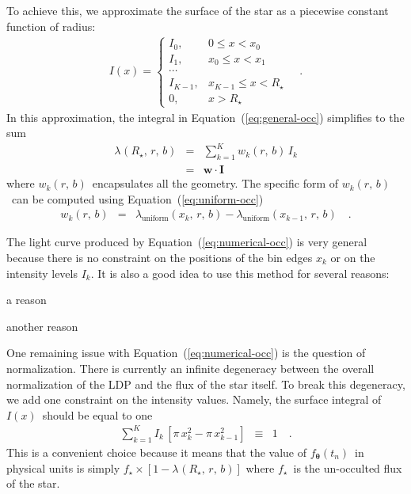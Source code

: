 \documentclass[12pt,preprint]{aastex}
\newcommand{\Eq}[1]{Equation~(\ref{eq:#1})}
\newcommand{\eq}[1]{\Eq{#1}}
\newcommand{\eqlabel}[1]{\label{eq:#1}}
\newcommand{\bvec}[1]{\ensuremath{\boldsymbol{#1}}}
\newcommand{\model}{\ensuremath{\bvec{\theta}}}
\newcommand{\tobs}{\ensuremath{t_n}}
\newcommand{\fmodel}{\ensuremath{f_{\model} (\tobs)}}
\newcommand{\rstar}{\ensuremath{R_\star}}
\newcommand{\rplanet}{\ensuremath{r}}
\newcommand{\impactpar}{\ensuremath{b}}
\newcommand{\occbase}[2]{\ensuremath{\lambda_{#1}(#2,\,\rplanet,\,\impactpar)}}
\newcommand{\occ}[1]{\occbase{#1}{\rstar}}
\newcommand{\occultation}{\occ{}}
\newcommand{\occuniformer}[1]{\occbase{\mathrm{uniform}}{#1}}
\newcommand{\rsurface}{\ensuremath{x}}
\newcommand{\ldp}{\ensuremath{I(\rsurface)}}
\newcommand{\geomw}{\ensuremath{w_k (\rplanet,\,\impactpar)}}
\newcommand{\fstar}{\ensuremath{f_\star}}
\begin{document}
To achieve this, we approximate the surface of the star as a piecewise
constant function of radius:
\begin{eqnarray}
    \ldp = \left \{ \begin{array}{ll}
        I_0, & 0 \le \rsurface < \rsurface_0 \\
        I_1, & \rsurface_0 \le \rsurface < \rsurface_1 \\
        \cdots & \\
        I_{K-1}, & \rsurface_{K-1} \le \rsurface < \rstar \\
        0, & \rsurface > \rstar
    \end{array}\right . \quad.
\end{eqnarray}
In this approximation, the integral in \eq{general-occ} simplifies to the sum
\begin{eqnarray}\eqlabel{numerical-occ}
    \occultation & = & \sum_{k=1}^K \geomw \, I_k \\
                 & = & \bvec{w} \cdot \bvec{I}
\end{eqnarray}
where \geomw\ encapsulates all the geometry.
The specific form of \geomw\ can be computed using \eq{uniform-occ}
\begin{eqnarray}
    \geomw & = & \occuniformer{\rsurface_k}
                 - \occuniformer{\rsurface_{k-1}} \quad.
\end{eqnarray}

The light curve produced by \eq{numerical-occ} is very general because
there is no constraint on the positions of the bin edges $\rsurface_k$ or on
the intensity levels $I_k$.
It is also a good idea to use this method for several reasons:
\begin{enumerate}
    {\item a reason}
    {\item another reason}
\end{enumerate}

One remaining issue with \eq{numerical-occ} is the question of normalization.
There is currently an infinite degeneracy between the overall normalization of
the LDP and the flux of the star itself.
To break this degeneracy, we add one constraint on the intensity values.
Namely, the surface integral of \ldp\ should be equal to one
\begin{eqnarray}
    \sum_{k=1}^{K} I_k \, \left [\pi\,\rsurface_k^2
                                 - \pi\,\rsurface_{k-1}^2 \right ]
        & \equiv & 1 \quad.
\end{eqnarray}
This is a convenient choice because it means that the value of \fmodel\ in
physical units is simply $\fstar \times \left [1 - \occultation \right ]$
where \fstar\ is the un-occulted flux of the star.
\end{document}
